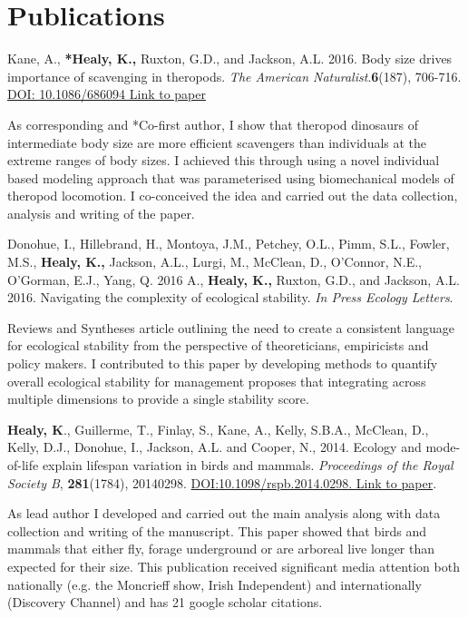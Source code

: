 \documentclass[10pt,a4paper]{article}
\begin{document}
\section{Publications}
\begin{flushleft}
\setlength{\parindent}{0mm}Kane, A., \textbf{*Healy, K.,} Ruxton, G.D., and Jackson, A.L. 2016. Body size drives importance of scavenging in theropods. \textit{The American Naturalist}.\textbf{6}(187), 706-716. \href{https://www.researchgate.net/profile/Kevin_Healy/publication/301279301_Body_Size_as_a_Driver_of_Scavenging_in_Theropod_Dinosaurs/links/570f8b2a08ae38897ba19c35.pdf.}{DOI: 10.1086/686094 Link to paper}
\smallskip
\par{\fontsize{10.5}{10} As corresponding and *Co-first author, I show that theropod dinosaurs of intermediate body size are more efficient scavengers than individuals at the extreme ranges of body sizes. I achieved this through using a novel individual based modeling approach that was parameterised using biomechanical models of theropod locomotion. I co-conceived the idea and carried out the data collection, analysis and writing of the paper.}

\bigskip

\setlength{\parindent}{0mm}Donohue, I., Hillebrand, H., Montoya, J.M., Petchey, O.L., Pimm, S.L., Fowler, M.S., \textbf{Healy, K.,} Jackson, A.L., Lurgi, M., McClean, D., O'Connor, N.E., O'Gorman, E.J., Yang, Q. 2016
 A., \textbf{Healy, K.,} Ruxton, G.D., and Jackson, A.L. 2016. Navigating the complexity of ecological stability. \textit{In Press Ecology Letters}.
\smallskip
\par{\fontsize{10.5}{10} Reviews and Syntheses article outlining the need to create a consistent language for ecological stability from the perspective of theoreticians, empiricists and policy makers. I contributed to this paper by developing methods to quantify overall ecological stability for management proposes that integrating across multiple dimensions to provide a single stability score.}

\bigskip

\textbf{Healy, K}., Guillerme, T., Finlay, S., Kane, A., Kelly, S.B.A., McClean, D., Kelly, D.J., Donohue, I., Jackson, A.L. and Cooper, N., 2014. Ecology and mode-of-life explain lifespan variation in birds and mammals. \textit{Proceedings of the Royal Society B}, \textbf{281}(1784), 20140298. \href{http://rspb.royalsocietypublishing.org/content/281/1784/20140298}{DOI:10.1098/rspb.2014.0298. Link to paper}.
\smallskip
\par{\fontsize{10.5}{10} As lead author I developed and carried out the main analysis along with data collection and writing of the manuscript. This paper showed that birds and mammals that either fly, forage underground or are arboreal live longer than expected for their size. This publication received significant media attention both nationally (e.g. the Moncrieff show, Irish Independent) and internationally (Discovery Channel) and has 21 google scholar citations.}


\end{flushleft}
\end{document}
